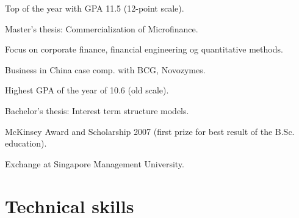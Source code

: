 \documentclass[a4paper]{janus-resume}
\begin{document}
\begin{minipage}[t]{0.49\textwidth}
Top of the year with GPA 11.5 (12-point scale).
\begin{tightitemize}
\item Master's thesis: Commercialization of Microfinance. \\
\item Focus on corporate finance, financial engineering og quantitative methods. \\
\item Business in China case comp. with BCG, Novozymes. \\
\end{tightitemize}

\sectionspace %

Highest GPA of the year of 10.6 (old scale).
\begin{tightitemize}
\item Bachelor's thesis: Interest term structure models. \\
\item McKinsey Award and Scholarship 2007 (first prize for best result of the B.Sc. education). \\
\item Exchange at Singapore Management University. \\
\end{tightitemize}

\sectionspace %





\section{Technical skills}


\end{minipage}
\end{document}
